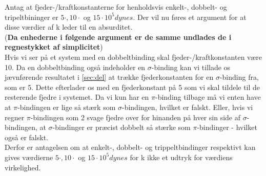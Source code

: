 Antag at fjeder-/kraftkonstanterne for henholdsvis enkelt-, dobbelt- og tripeltbininger er $5 \cdot, 10 \cdot$ og $15 \cdot 10^5 dynes$. Der vil nu føres et argument for at disse værdier af k leder til en absurditet. 
\\
(\textbf{Da enhederne i følgende argument er de samme undlades de i regnestykket af simplicitet})
\\
Hvis vi ser på et system med en dobbeltbinding skal fjeder-/kraftkonstanten være 10. Da en dobbeltbinding også indeholder en $\sigma$-binding kan vi tillade os jævnførende resultatet i \ref{sec:del} at trække fjederkonstanten for en $\sigma$-binding fra, som er 5. Dette efterlader os med en fjederkonstant på 5 som vi skal tildele til de resterende fjedre i systemet. Da vi kun har en $\pi$-binding tilbage må vi enten have at $\pi$-bindingen er lige så stærk som $\sigma$-bindingen, hvilket er falskt. Eller, hvis vi regner $\pi$-bindingen som 2 svage fjedre over for hinanden på hver sin side af $\sigma$-bindingen, at $\sigma$-bindinger er præcist dobbelt så stærke som $\pi$-bindinger - hvilket også er falskt.
\\

Derfor er antagelsen om at enkelt-, dobbelt- og trippeltbindinger respektivt kan gives værdierne $5 \cdot, 10 \cdot$ og $15 \cdot 10^5 dynes$ for k ikke et udtryk for værdiens virkelighed. 